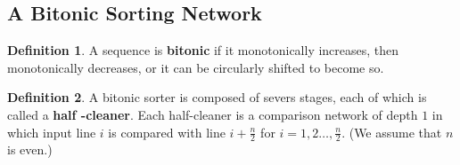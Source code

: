 \documentclass[12pt,openany]{book}
\theoremstyle{definition}
\newtheorem{definition}{Definition}[chapter]
\begin{document}
	\newpage
	\subsection{A Bitonic Sorting Network}
	\begin{tcolorbox}[colframe=defcolor,title={\color{white}\bf Bitonic}]
		\begin{definition}
			A sequence is \textbf{bitonic} if it monotonically increases, then monotonically decreases, or it can be circularly shifted to become so.
		\end{definition}
	\end{tcolorbox}
	\vspace{20pt}
	
	\begin{tcolorbox}[colframe=defcolor,title={\color{white}\bf Half-cleaner}]
		\begin{definition}A bitonic sorter is composed of severs stages, each of which is called a \textbf{half -cleaner}. Each half-cleaner is a comparison network of depth $1$ in which input line $i$ is compared with line $i+\frac{n}{2}$ for $i=1,2\dots,\frac{n}{2}$. (We assume that $n$ is even.)
					
		\end{definition}
	\end{tcolorbox}
\end{document}
